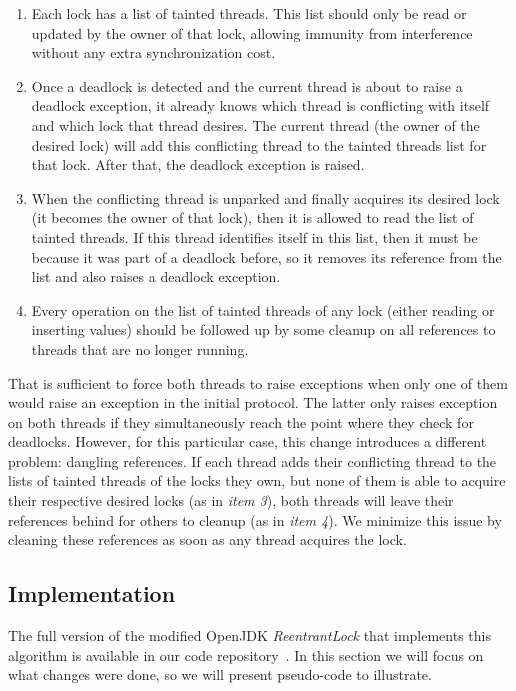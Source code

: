 \begin{enumerate}
\item Each lock has a list of tainted threads. This list should only be read or updated by the owner of that lock, allowing immunity from interference without any extra synchronization cost.
\item Once a deadlock is detected and the current thread is about to raise a deadlock exception, it already knows which thread is conflicting with itself and which lock that thread desires. The current thread (the owner of the desired lock) will add this conflicting thread to the tainted threads list for that lock. After that, the deadlock exception is raised.
\item When the conflicting thread is unparked and finally acquires its desired lock (it becomes the owner of that lock), then it is allowed to read the list of tainted threads. If this thread identifies itself in this list, then it must be because it was part of a deadlock before, so it removes its reference from the list and also raises a deadlock exception.
\item Every operation on the list of tainted threads of any lock (either reading or inserting values) should be followed up by some cleanup on all references to threads that are no longer running.
\end{enumerate}

That is sufficient to force both threads to raise exceptions when only one of them would raise an exception in the initial protocol. The latter only raises exception on both threads if they simultaneously reach the point where they check for deadlocks. However, for this particular case, this change introduces a different problem: dangling references.
If each thread adds their conflicting thread to the lists of tainted threads of the locks they own, 
but none of them is able to acquire their respective desired locks (as in \emph{item 3}),
both threads will leave their references behind for others to cleanup (as in \emph{item 4}).
We minimize this issue by cleaning these references as soon as any thread acquires the lock.

\subsection{Implementation}

The full version of the modified OpenJDK \emph{ReentrantLock} that implements this algorithm is available in our code repository~\cite{repo}.
In this section we will focus on what changes were done, so we will present pseudo-code to illustrate.

